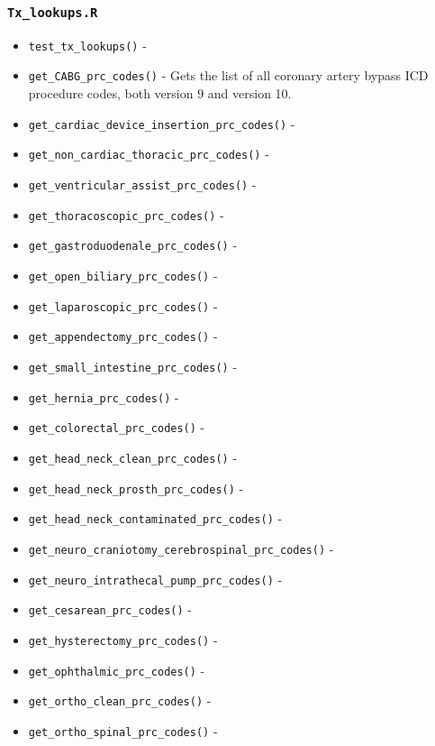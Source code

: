 \documentclass[
]{book}
\providecommand{\tightlist}{%
  \setlength{\itemsep}{0pt}\setlength{\parskip}{0pt}}
\begin{document}
\hypertarget{tx_lookups.r}{%
\subsubsection{\texorpdfstring{\texttt{Tx\_lookups.R}}{Tx\_lookups.R}}\label{tx_lookups.r}}

\begin{itemize}
\tightlist
\item
  \texttt{test\_tx\_lookups()} -
\item
  \texttt{get\_CABG\_prc\_codes()} - Gets the list of all coronary artery bypass ICD procedure codes, both version 9 and version 10.
\item
  \texttt{get\_cardiac\_device\_insertion\_prc\_codes()} -
\item
  \texttt{get\_non\_cardiac\_thoracic\_prc\_codes()} -
\item
  \texttt{get\_ventricular\_assist\_prc\_codes()} -
\item
  \texttt{get\_thoracoscopic\_prc\_codes()} -
\item
  \texttt{get\_gastroduodenale\_prc\_codes()} -
\item
  \texttt{get\_open\_biliary\_prc\_codes()} -
\item
  \texttt{get\_laparoscopic\_prc\_codes()} -
\item
  \texttt{get\_appendectomy\_prc\_codes()} -
\item
  \texttt{get\_small\_intestine\_prc\_codes()} -
\item
  \texttt{get\_hernia\_prc\_codes()} -
\item
  \texttt{get\_colorectal\_prc\_codes()} -
\item
  \texttt{get\_head\_neck\_clean\_prc\_codes()} -
\item
  \texttt{get\_head\_neck\_prosth\_prc\_codes()} -
\item
  \texttt{get\_head\_neck\_contaminated\_prc\_codes()} -
\item
  \texttt{get\_neuro\_craniotomy\_cerebrospinal\_prc\_codes()} -
\item
  \texttt{get\_neuro\_intrathecal\_pump\_prc\_codes()} -
\item
  \texttt{get\_cesarean\_prc\_codes()} -
\item
  \texttt{get\_hysterectomy\_prc\_codes()} -
\item
  \texttt{get\_ophthalmic\_prc\_codes()} -
\item
  \texttt{get\_ortho\_clean\_prc\_codes()} -
\item
  \texttt{get\_ortho\_spinal\_prc\_codes()} -

\end{itemize}
\end{document}
